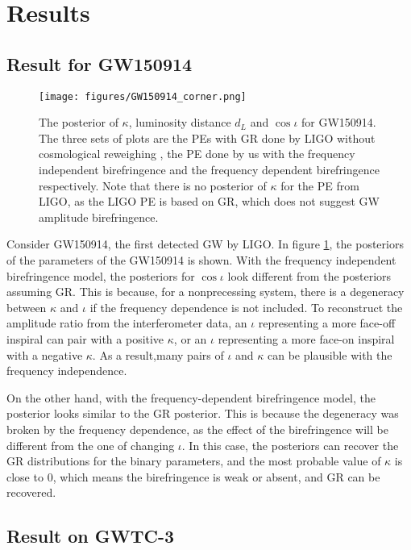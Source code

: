 \documentclass[twocolumn]{aastex631}
\begin{document}
\section{Results}

\subsection{Result for GW150914}

\begin{figure}[h!]
    \texttt{[image: figures/GW150914\_corner.png]}
    \caption{
        The posterior of $\kappa$, luminosity distance $d_L$ and $\cos{\iota}$ for GW150914.
    The three sets of plots are the PEs with GR done by LIGO without cosmological reweighing \citep{GWTC-2.1, GWTC-3},
    the PE done by us with the frequency independent birefringence and the frequency dependent birefringence respectively.
    Note that there is no posterior of $\kappa$ for the PE from LIGO, as the LIGO PE is based on GR,
    which does not suggest GW amplitude birefringence.
    }
    \label{fig:GW150914_corner}
\end{figure}

Consider GW150914, the first detected GW by LIGO. In figure \ref{fig:GW150914_corner}, the posteriors of the parameters of the GW150914 is shown.
With the frequency independent birefringence model, the posteriors for $\cos\iota$ look different from the posteriors assuming GR.
This is because, for a nonprecessing system, there is a degeneracy between $\kappa$ and $\iota$ if the frequency dependence is not included.
To reconstruct the amplitude ratio from the interferometer data, an $\iota$ representing a more face-off inspiral can pair with a positive $\kappa$,
or an $\iota$ representing a more face-on inspiral with a negative $\kappa$.
As a result,many pairs of $\iota$ and $\kappa$ can be plausible with the frequency independence.

On the other hand, with the frequency-dependent birefringence model, the posterior looks similar to the GR posterior.
This is because the degeneracy was broken by the frequency dependence, as the effect of the birefringence will be different from the one of changing $\iota$.
In this case, the posteriors can recover the GR distributions for the binary parameters,
and the most probable value of $\kappa$ is close to $0$, which means the birefringence is weak or absent, and GR can be recovered.

\subsection{Result on GWTC-3}
\end{document}
